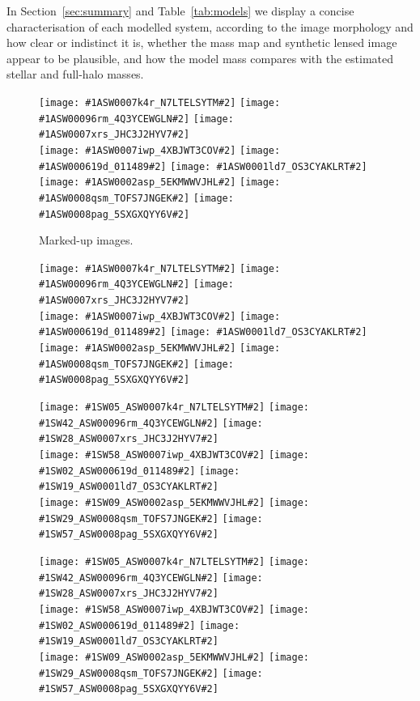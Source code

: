 \documentclass[fleqn,usenatbib]{mnras}
\begin{document}
In Section~\ref{sec:summary} and Table~\ref{tab:models} we display a
concise characterisation of each modelled system, according to the
image morphology and how clear or indistinct it is, whether the mass
map and synthetic lensed image appear to be plausible, and how the
model mass compares with the estimated stellar and full-halo masses.

\def\pwidth{.32\linewidth}

\def\includeten#1#2{
\texttt{[image: \#1ASW0007k4r\_N7LTELSYTM\#2]}%
\texttt{[image: \#1ASW00096rm\_4Q3YCEWGLN\#2]}%
\texttt{[image: \#1ASW0007xrs\_JHC3J2HYV7\#2]}\\
\texttt{[image: \#1ASW0007iwp\_4XBJWT3COV\#2]}%
\texttt{[image: \#1ASW000619d\_011489\#2]}%
\texttt{[image: \#1ASW0001ld7\_OS3CYAKLRT\#2]}\\
\texttt{[image: \#1ASW0002asp\_5EKMWWVJHL\#2]}%
\texttt{[image: \#1ASW0008qsm\_TOFS7JNGEK\#2]}%
\texttt{[image: \#1ASW0008pag\_5SXGXQYY6V\#2]}\\
}

\def\includezehn#1#2{
\texttt{[image: \#1SW05\_ASW0007k4r\_N7LTELSYTM\#2]}%
\texttt{[image: \#1SW42\_ASW00096rm\_4Q3YCEWGLN\#2]}%
\texttt{[image: \#1SW28\_ASW0007xrs\_JHC3J2HYV7\#2]}\\
\texttt{[image: \#1SW58\_ASW0007iwp\_4XBJWT3COV\#2]}%
\texttt{[image: \#1SW02\_ASW000619d\_011489\#2]}%
\texttt{[image: \#1SW19\_ASW0001ld7\_OS3CYAKLRT\#2]}\\
\texttt{[image: \#1SW09\_ASW0002asp\_5EKMWWVJHL\#2]}%
\texttt{[image: \#1SW29\_ASW0008qsm\_TOFS7JNGEK\#2]}%
\texttt{[image: \#1SW57\_ASW0008pag\_5SXGXQYY6V\#2]}\\
}

\begin{figure}
\includeten{spaghetti/}{_input}
\caption{Marked-up images.}
\end{figure}

\begin{figure}
\includeten{img/nsynth/}{_nsynth}
\caption{}
\end{figure}

\begin{figure}
\includezehn{img/arrival_spaghetti/}{_arrival_spaghetti}
\caption{}
\end{figure}

\begin{figure}
\includezehn{img/kappa_map/}{_kappa_map}
\caption{}
\end{figure}
\end{document}
